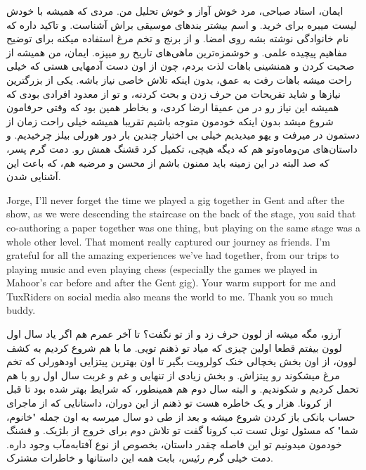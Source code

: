 \begin{flushright}
\foreignlanguage{persian}
{
ایمان، استاد صباحی، مرد خوش آواز و خوش تحلیل من. مردی که همیشه با خودش لیست میبره برای خرید. و اسم بیشتر بندهای موسیقی براش آشناست. و تاکید داره که نام خانوادگی نوشته بشه روی امضا. و از برنج و تخم مرغ استفاده میکنه برای توضیح مفاهیم پیچیده علمی. و خوشمزه‌ترین ماهی‌های تاریخ رو میپزه. ایمان، من همیشه از صحبت کردن و همنشینی باهات لذت بردم، چون از اون دست آدمهایی هستی که خیلی راحت میشه باهات رفت به عمق، بدون اینکه تلاش خاصی نیاز باشه. یکی از بزرگترین نیازها و شاید تفریحات من حرف زدن و بحث کردنه، و تو از معدود افرادی بودی که همیشه این نیاز رو در من عمیقا ارضا کردی، و بخاطر همین بود که وقتی حرفامون شروع میشد بدون اینکه خودمون متوجه باشیم تقریبا همیشه خیلی راحت زمان از دستمون در میرفت و یهو میدیدیم خیلی بی اختیار چندین بار دور هورلی بیلز چرخیدیم. و داستان‌های من‌وماه‌وتو هم که دیگه هیچی، تکمیل کرد قشنگ همش رو. دمت گرم پسر، که صد البته در این زمینه باید ممنون باشم از محسن و مرضیه هم، که باعث این آشنایی شدن.
}
\end{flushright}

Jorge, I'll never forget the time we played a gig together in Gent and after the show, as we were descending the staircase on the back of the stage, you said that co-authoring a paper together was one thing, but playing on the same stage was a whole other level. That moment really captured our journey as friends. I'm grateful for all the amazing experiences we've had together, from our trips to playing music and even playing chess (especially the games we played in Mahoor's car before and after the Gent gig).  Your warm support for me and TuxRiders on social media also means the world to me. Thank you so much buddy.

\begin{flushright}
\foreignlanguage{persian}
{
آرزو، مگه میشه از لوون حرف زد و از تو نگفت؟ تا آخر عمرم هم اگر یاد سال اول لوون بیفتم قطعا اولین چیزی که میاد تو ذهنم تویی. ما با هم شروع کردیم به کشف لوون، از اون بخش یخچالی خنک کولرویت بگیر تا اون بهترین پیتزایی اودهورلی که تخم مرغ میشکوند رو پیتزاش. و بخش زیادی از تنهایی و غم و غربت سال اول رو با هم تحمل کردیم و شکوندیم. و البته سال دوم هم همینطور، که شرایط بهتر شده بود تا قبل از کرونا. هزار و یک خاطره هست تو ذهنم از این دوران، داستانایی که از ماجرای حساب بانکی باز کردن شروع میشه و بعد از طی دو سال میرسه به اون جمله "خانوم، شما" که مسئول تونل تست تب کرونا گفت تو تلاش دوم برای خروج از بلژیک. و قشنگ خودمون میدونیم تو این فاصله چقدر داستان، بخصوص از نوع آفتابه‌مآب وجود داره. دمت خیلی گرم رئیس، بابت همه این داستانها و خاطرات مشترک.
}
\end{flushright}

